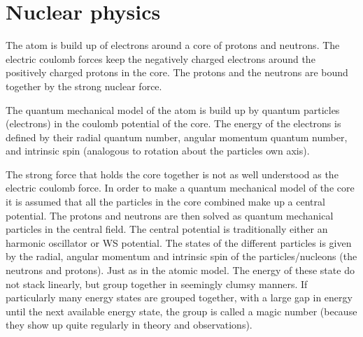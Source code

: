 \section{Nuclear physics }

The atom is build up of electrons around a core of protons and neutrons.
The electric coulomb forces keep the negatively charged electrons around the positively charged
protons in the core. The protons and the neutrons are bound together by the strong nuclear force.

The quantum mechanical model of the atom is build up by quantum particles (electrons)
in the coulomb potential of the core. The energy of the electrons is defined by their
radial quantum number, angular momentum quantum number, and intrinsic spin (analogous to
rotation about the particles own axis).

The strong force that holds the core together is not as well understood as the electric coulomb
force. In order to make a quantum mechanical model of the core it is assumed that all the
particles in the core combined make up a central potential. The protons and neutrons are
then solved as quantum mechanical particles in the central field.
The central potential is traditionally either an harmonic oscillator or WS potential.
The states of the different particles is given by the radial, angular momentum and intrinsic
spin of the particles/nucleons (the neutrons and protons). Just as in the atomic model.
The energy of these state do not stack linearly, but group together in seemingly clumsy manners.
If particularly many energy states are grouped together, with a large gap in energy until the next
available energy state, the group is called a magic number (because they show up quite regularly in theory
and observations).

